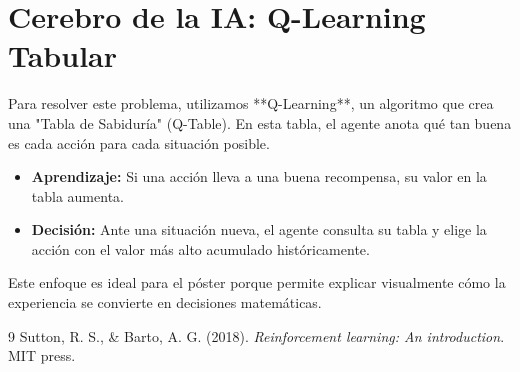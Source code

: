 \documentclass[12pt,a4paper]{article}
\begin{document}
\section{Cerebro de la IA: Q-Learning Tabular}
Para resolver este problema, utilizamos **Q-Learning**, un algoritmo que crea una "Tabla de Sabiduría" (Q-Table). En esta tabla, el agente anota qué tan buena es cada acción para cada situación posible.
\begin{itemize}
    \item \textbf{Aprendizaje:} Si una acción lleva a una buena recompensa, su valor en la tabla aumenta.
    \item \textbf{Decisión:} Ante una situación nueva, el agente consulta su tabla y elige la acción con el valor más alto acumulado históricamente.
\end{itemize}
Este enfoque es ideal para el póster porque permite explicar visualmente cómo la experiencia se convierte en decisiones matemáticas.


\begin{thebibliography}{9}
     Sutton, R. S., \& Barto, A. G. (2018). \textit{Reinforcement learning: An introduction}. MIT press.
\end{thebibliography}
\end{document}
